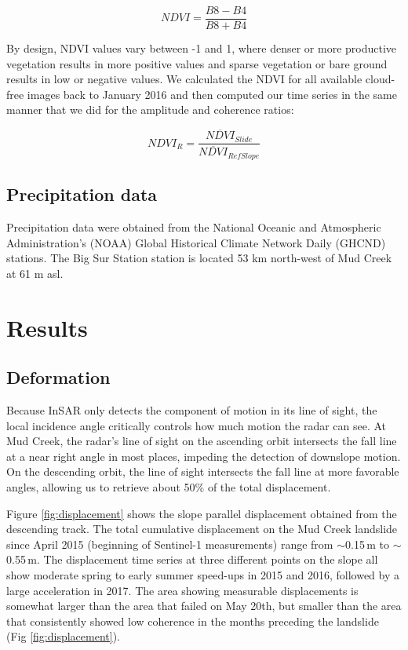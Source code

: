 \documentclass[journal abbreviation, manuscript]{copernicus}
\begin{document}
\begin{equation}
    NDVI = \frac{{B8 - B4}}{{B8 + B4}}
\end{equation}

By design, NDVI values vary between -1 and 1, where denser or more productive vegetation results in more positive values and sparse vegetation or bare ground results in low or negative values. We calculated the NDVI for all available cloud-free images back to January 2016 and then computed our time series in the same manner that we did for the amplitude and coherence ratios: \par
\begin{equation}
    NDVI_R= \frac{\overline{NDVI}_{Slide}}{\overline{NDVI}_{RefSlope}}
\end{equation}

\subsection{Precipitation data}
Precipitation data were obtained from the National Oceanic and Atmospheric Administration's (NOAA) Global Historical Climate Network Daily (GHCND) stations. The Big Sur Station station is located 53 km north-west of Mud Creek at 61 m asl.%

\section{Results}
\subsection{Deformation}
Because InSAR only detects the component of motion in its line of sight, the local incidence angle critically controls how much motion the radar can see. At Mud Creek, the radar's line of sight on the ascending orbit intersects the fall line at a near right angle in most places, impeding the detection of downslope motion. On the descending orbit, the line of sight intersects the fall line at more favorable angles, allowing us to retrieve about 50\% of the total displacement.\par 
Figure \ref{fig:displacement} shows the slope parallel displacement obtained from the descending track. The total cumulative displacement on the Mud Creek landslide since April 2015 (beginning of Sentinel-1 measurements) range from $\sim$0.15\,m to $\sim$0.55\,m. The displacement time series at three different points on the slope all show moderate spring to early summer speed-ups in 2015 and 2016, followed by a large acceleration in 2017. The area showing measurable displacements is somewhat larger than the area that failed on May 20th, but smaller than the area that consistently showed low coherence in the months preceding the landslide (Fig \ref{fig:displacement}).
\end{document}

